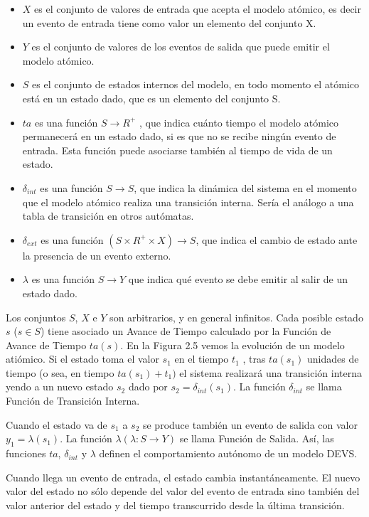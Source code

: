 \documentclass[a4paper,	11pt]{report}
\begin{document}
\begin{itemize}
\item $X$ es el conjunto de valores de entrada que acepta el modelo atómico, es decir un evento de entrada tiene como valor un elemento del conjunto X.
\item $Y$ es el conjunto de valores de los eventos de salida que puede emitir el modelo atómico.
\item $S$ es el conjunto de estados internos del modelo, en todo momento el atómico está en un estado dado, que es un elemento del conjunto S.
\item $ta$ es una función $S \to R^{+}$ , que indica cuánto tiempo el modelo atómico permanecerá en un estado dado, si es que no se recibe ningún evento de entrada. Esta función puede asociarse también al tiempo de vida de un estado.
\item $\delta_{int}$ es una función $S \to S$, que indica la dinámica del sistema en el momento que el modelo atómico realiza una transición interna. Sería el análogo a una tabla de transición en otros autómatas.
\item $\delta_{ext}$ es una función $(S \times R^{+} \times X) \to S$, que indica el cambio de estado ante la presencia de un evento externo.
\item $\lambda$ es una función $S \to Y$ que indica qué evento se debe emitir al salir de un estado dado.
\end{itemize}

Los conjuntos $S$, $X$ e $Y$ son arbitrarios, y en general infinitos. Cada posible estado $s$ ($s \in S$) tiene asociado un Avance de Tiempo calculado por la Función de Avance de Tiempo $ta(s)$.
En la Figura 2.5 vemos la evolución de un modelo atiómico. Si el estado toma el valor $s_1$ en el tiempo $t_1$ , tras $ta(s_1)$ unidades de tiempo (o sea, en tiempo $ta(s_1 ) + t_1 )$ el sistema realizará una transición interna yendo a un nuevo estado $s_2$ dado por $s_2 = \delta_{int} (s_1 )$. La función $\delta_{int}$ se llama Función de Transición Interna.

Cuando el estado va de $s_1$ a $s_2$ se produce también un evento de salida con valor $y_1 = \lambda(s_1)$. La función $\lambda (\lambda : S \to Y )$ se llama Función de Salida. Así, las funciones $ta$, $\delta_{int}$ y $\lambda$ definen el comportamiento autónomo de un modelo DEVS.

Cuando llega un evento de entrada, el estado cambia instantáneamente. El nuevo valor del estado no sólo depende del valor del evento de entrada sino también del valor anterior del estado y del tiempo transcurrido desde la última transición.
\end{document}
